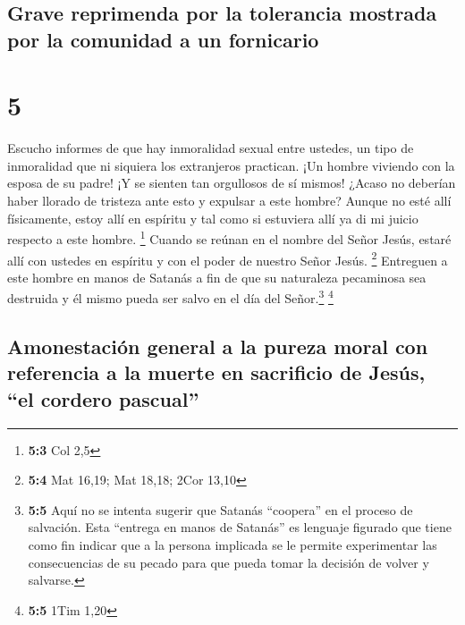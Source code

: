 \hypertarget{grave-reprimenda-por-la-tolerancia-mostrada-por-la-comunidad-a-un-fornicario}{%
\subsection{Grave reprimenda por la tolerancia mostrada por la comunidad
a un
fornicario}\label{grave-reprimenda-por-la-tolerancia-mostrada-por-la-comunidad-a-un-fornicario}}

\hypertarget{section-4}{%
\section{5}\label{section-4}}

 Escucho informes de que hay inmoralidad sexual entre
ustedes, un tipo de inmoralidad que ni siquiera los extranjeros
practican. ¡Un hombre viviendo con la esposa de su padre! 
¡Y se sienten tan orgullosos de sí mismos! ¿Acaso no deberían haber
llorado de tristeza ante esto y expulsar a este hombre? 
Aunque no esté allí físicamente, estoy allí en espíritu y tal como si
estuviera allí ya di mi juicio respecto a este hombre. \footnote{\textbf{5:3}
  Col 2,5}  Cuando se reúnan en el nombre del Señor Jesús,
estaré allí con ustedes en espíritu y con el poder de nuestro Señor
Jesús. \footnote{\textbf{5:4} Mat 16,19; Mat 18,18; 2Cor 13,10}
 Entreguen a este hombre en manos de Satanás a fin de que
su naturaleza pecaminosa sea destruida y él mismo pueda ser salvo en el
día del Señor.\footnote{\textbf{5:5} Aquí no se intenta sugerir que
  Satanás ``coopera'' en el proceso de salvación. Esta ``entrega en
  manos de Satanás'' es lenguaje figurado que tiene como fin indicar que
  a la persona implicada se le permite experimentar las consecuencias de
  su pecado para que pueda tomar la decisión de volver y salvarse.}
\footnote{\textbf{5:5} 1Tim 1,20}

\hypertarget{amonestaciuxf3n-general-a-la-pureza-moral-con-referencia-a-la-muerte-en-sacrificio-de-jesuxfas-el-cordero-pascual}{%
\subsection{Amonestación general a la pureza moral con referencia a la
muerte en sacrificio de Jesús, ``el cordero
pascual''}\label{amonestaciuxf3n-general-a-la-pureza-moral-con-referencia-a-la-muerte-en-sacrificio-de-jesuxfas-el-cordero-pascual}}

